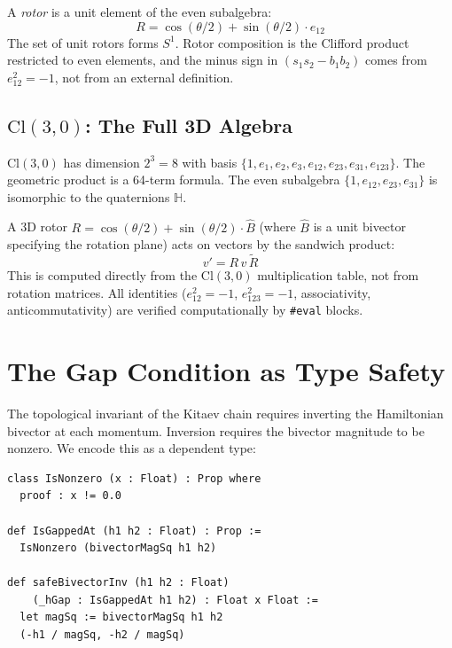 \documentclass[11pt,a4paper]{article}
\newcommand{\Cl}[1]{\mathrm{Cl}(#1)}
\newcommand{\eone}{e_1}
\newcommand{\etwo}{e_2}
\newcommand{\ethree}{e_3}
\newcommand{\eonetwo}{e_{12}}
\newcommand{\etwothree}{e_{23}}
\newcommand{\ethreeone}{e_{31}}
\newcommand{\eonetwothree}{e_{123}}
\newcommand{\rev}[1]{\widetilde{#1}}
\begin{document}
A \emph{rotor} is a unit element of the even subalgebra:
\begin{equation}
R = \cos(\theta/2) + \sin(\theta/2)\cdot\eonetwo
\end{equation}
The set of unit rotors forms $S^1$. Rotor composition is the Clifford product restricted to even elements, and the minus sign in $(s_1 s_2 - b_1 b_2)$ comes from $\eonetwo^2 = -1$, not from an external definition.

\subsection{\texorpdfstring{$\Cl{3,0}$}{Cl(3,0)}: The Full 3D Algebra}

$\Cl{3,0}$ has dimension $2^3 = 8$ with basis $\{1, \eone, \etwo, \ethree, \eonetwo, \etwothree, \ethreeone, \eonetwothree\}$. The geometric product is a 64-term formula. The even subalgebra $\{1, \eonetwo, \etwothree, \ethreeone\}$ is isomorphic to the quaternions $\mathbb{H}$.

A 3D rotor $R = \cos(\theta/2) + \sin(\theta/2)\cdot\hat{B}$ (where $\hat{B}$ is a unit bivector specifying the rotation plane) acts on vectors by the sandwich product:
\begin{equation}
v' = R\,v\,\rev{R}
\end{equation}
This is computed directly from the $\Cl{3,0}$ multiplication table, not from rotation matrices. All identities ($\eonetwo^2 = -1$, $\eonetwothree^2 = -1$, associativity, anticommutativity) are verified computationally by \texttt{\#eval} blocks.

\section{The Gap Condition as Type Safety}

The topological invariant of the Kitaev chain requires inverting the Hamiltonian bivector at each momentum. Inversion requires the bivector magnitude to be nonzero. We encode this as a dependent type:

\begin{lstlisting}
class IsNonzero (x : Float) : Prop where
  proof : x != 0.0

def IsGappedAt (h1 h2 : Float) : Prop :=
  IsNonzero (bivectorMagSq h1 h2)

def safeBivectorInv (h1 h2 : Float)
    (_hGap : IsGappedAt h1 h2) : Float x Float :=
  let magSq := bivectorMagSq h1 h2
  (-h1 / magSq, -h2 / magSq)
\end{lstlisting}
\end{document}
